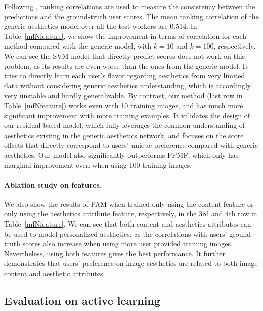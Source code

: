Following \cite{kong2016photo}, ranking correlations are used to measure the consistency between the predictions and the ground-truth user scores. The mean ranking correlation of the generic aesthetics model over all the test workers are 0.514. In Table~\ref{mfNfeature}, we show the improvement in terms of correlation for each method compared with the generic model, with $k = 10$ and $k = 100$, respectively. We can see the SVM model that directly predict scores does not work on this problem, as its results are even worse than the ones from the generic model. It tries to directly learn each user's flavor regarding aesthetics from very limited data without considering generic aesthetics understanding, which is accordingly very unstable and hardly generalizable. By contrast, our method (last row in Table~\ref{mfNfeature}) works even with 10 training images, and has much more significant improvement with more training examples. It validates the design of our residual-based model, which fully leverages the common understanding of aesthetics existing in the generic aesthetics network, and focuses on the score offsets that directly correspond to users' unique preference compared with generic aesthetics. Our model also significantly outperforms FPMF, which only has marginal improvement even when using 100 training images.

\paragraph{Ablation study on features.}  We also show the results of PAM when trained only using the content feature or only using the aesthetics attribute feature, respectively, in the 3rd and 4th row in Table~\ref{mfNfeature}. We can see that both content and aesthetics attributes can be used to model personalized aesthetics, as the correlations with users' ground truth scores also increase  when using more user provided training images. Nevertheless, using both features gives the best performance. It further demonstrates that users' preference on image aesthetics are related to both image content and aesthetic attributes.


\subsection{Evaluation on active learning}

